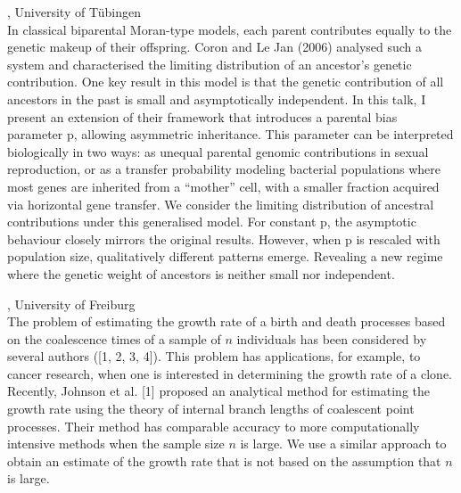 \documentclass[12pt,a4paper]{article}
\begin{document}
, University of Tübingen \\[2ex] In classical biparental Moran-type models, each parent contributes equally to the genetic makeup of their offspring. Coron and Le Jan (2006) analysed such a system and characterised the limiting distribution of an ancestor’s genetic contribution. One key result in this model is that the genetic contribution of all ancestors in the past is small and asymptotically independent. In this talk, I present an extension of their framework that introduces a parental bias parameter p, allowing asymmetric inheritance. This parameter can be interpreted biologically in two ways: as unequal parental genomic contributions in sexual reproduction, or as a transfer probability modeling bacterial populations where most genes are inherited from a “mother” cell, with a smaller fraction acquired via horizontal gene transfer. We consider the limiting distribution of ancestral contributions under this generalised model. For constant p, the asymptotic behaviour closely mirrors the original results. However, when p is rescaled with population size, qualitatively different patterns emerge. Revealing a new regime where the genetic weight of ancestors is neither small nor independent. 

\bigskip\bigskip

, University of Freiburg \\[2ex] The problem of estimating the growth rate of a birth and death processes based on the coalescence times of a sample of $n$ individuals has been considered by several authors ([1, 2, 3, 4]). This problem has applications, for example, to cancer research, when one is interested in determining the growth rate of a clone. Recently, Johnson et al. [1] proposed an analytical method for estimating the growth rate using the theory of internal branch lengths of coalescent point processes. Their method has comparable accuracy to more computationally intensive methods when the sample size $n$ is large. We use a similar approach to obtain an estimate of the growth rate that is not based on the assumption that $n$ is large. 
\end{document}
